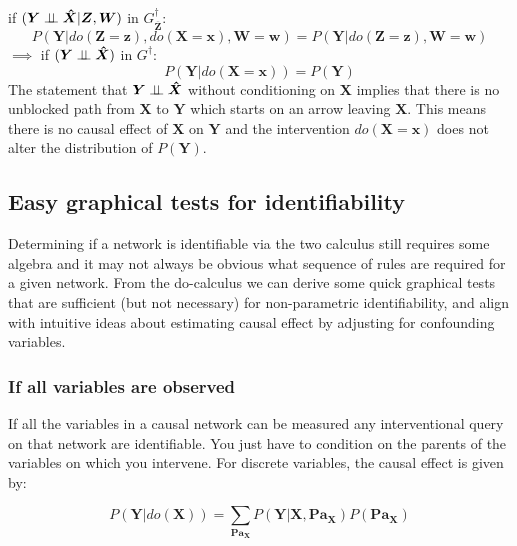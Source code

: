 \documentclass[11pt,a4paper]{article}
\begin{document}
if $(\boldsymbol{Y} \perp\!\!\!\perp \boldsymbol{\hat{X}} |\boldsymbol{Z},\boldsymbol{W})$ in $G^{\dagger}_{\boldsymbol{\overline{Z}}}$:
\begin{equation}
\label{eq:Do3}
P(\boldsymbol{Y}|do(\boldsymbol{Z}=\boldsymbol{z}),do(\boldsymbol{X}=\boldsymbol{x}),\boldsymbol{W}=\boldsymbol{w}) = P(\boldsymbol{Y}|do(\boldsymbol{Z}=\boldsymbol{z}),\boldsymbol{W}=\boldsymbol{w})
\end{equation}
$\implies$ if  $(\boldsymbol{Y} \perp\!\!\!\perp \boldsymbol{\hat{X}})$ in $G^{\dagger}$:
\begin{equation}
\label{eq:Do32}
P(\boldsymbol{Y}|do(\boldsymbol{X}=\boldsymbol{x})) = P(\boldsymbol{Y})
\end{equation}
The statement that $\boldsymbol{Y} \perp\!\!\!\perp \boldsymbol{\hat{X}}$ without conditioning on $\boldsymbol{X}$ implies that there is no unblocked path from $\boldsymbol{X}$ to $\boldsymbol{Y}$ which starts on an arrow leaving $\boldsymbol{X}$. This means there is no causal effect of $\boldsymbol{X}$ on $\boldsymbol{Y}$ and the intervention $do(\boldsymbol{X}=\boldsymbol{x})$ does not alter the distribution of $P(\boldsymbol{Y})$.

\subsection{Easy graphical tests for identifiability}
Determining if a network is identifiable via the two calculus still requires some algebra and it may not always be obvious what sequence of rules are required for a given network. From the do-calculus we can derive some quick graphical tests that are sufficient (but not necessary) for non-parametric identifiability, and align with intuitive ideas about estimating causal effect by adjusting for confounding variables. 

\subsubsection{If all variables are observed}
If all the variables in a causal network can be measured any interventional query on that network are identifiable. You just have to condition on the parents of the variables on which you intervene. For discrete variables, the causal effect is given by:

\begin{equation}
\label{eq:allvarsobserved}
P(\boldsymbol{Y}|do(\boldsymbol{X})) = \sum_{\boldsymbol{Pa_{X}}}{P(\boldsymbol{Y}|\boldsymbol{X},\boldsymbol{Pa_{X}})P(\boldsymbol{Pa_{X}})}
\end{equation}
\end{document}
